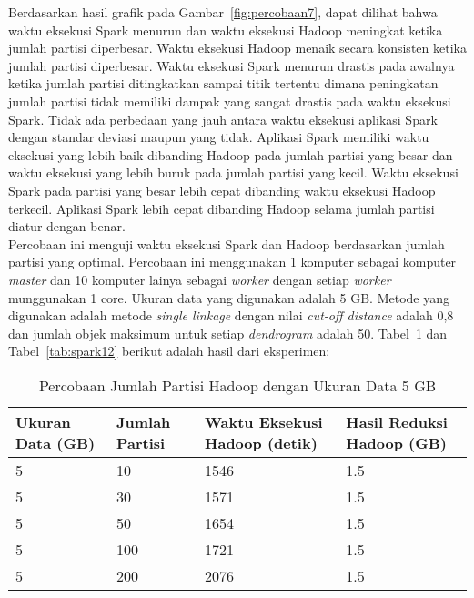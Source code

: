 Berdasarkan hasil grafik pada Gambar~\ref{fig:percobaan7}, dapat dilihat bahwa waktu eksekusi Spark menurun dan waktu eksekusi Hadoop meningkat ketika jumlah partisi diperbesar. Waktu eksekusi Hadoop menaik secara konsisten ketika jumlah partisi diperbesar. Waktu eksekusi Spark menurun drastis pada awalnya ketika jumlah partisi ditingkatkan sampai titik tertentu dimana peningkatan jumlah partisi tidak memiliki dampak yang sangat drastis pada waktu eksekusi Spark. Tidak ada perbedaan yang jauh antara waktu eksekusi aplikasi Spark dengan standar deviasi maupun yang tidak. Aplikasi Spark memiliki waktu eksekusi yang lebih baik dibanding Hadoop pada jumlah partisi yang besar dan waktu eksekusi yang lebih buruk pada jumlah partisi yang kecil. Waktu eksekusi Spark pada partisi yang besar lebih cepat dibanding waktu eksekusi Hadoop terkecil. Aplikasi Spark lebih cepat dibanding Hadoop selama jumlah partisi diatur dengan benar.\\







Percobaan ini menguji waktu eksekusi Spark dan Hadoop berdasarkan jumlah partisi yang optimal. Percobaan ini menggunakan 1 komputer sebagai komputer \textit{master} dan 10 komputer lainya sebagai \textit{worker} dengan setiap \textit{worker} munggunakan 1 core. Ukuran data yang digunakan adalah 5 GB. Metode yang digunakan adalah metode \textit{single linkage} dengan nilai \textit{cut-off distance} adalah 0,8 dan jumlah objek maksimum untuk setiap \textit{dendrogram} adalah 50. Tabel~\ref{tab:spark11} dan Tabel~\ref{tab:spark12} berikut adalah hasil dari eksperimen:





\begin{table}[H] 
	\centering 
	\caption{Percobaan Jumlah Partisi Hadoop dengan Ukuran Data 5 GB}
	\label{tab:spark11}
	\begin{tabular}{|p{3cm}|p{3cm}|p{4cm}|p{4cm}|}
\hline
Ukuran Data (GB) & Jumlah Partisi &  Waktu Eksekusi Hadoop (detik) & Hasil Reduksi Hadoop (GB)\\
\hline
5 & 10 & 1546  & 1.5  \\
\hline
5 & 30 & 1571  & 1.5  \\
\hline
5 & 50 & 1654  & 1.5   \\
\hline
5 & 100 & 1721 & 1.5   \\
\hline
5 & 200 & 2076  & 1.5   \\
\hline


\hline

	\end{tabular} 
\end{table}






